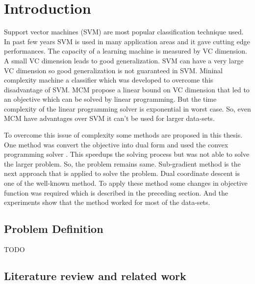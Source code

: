 \chapter{Introduction}

Support vector machines (SVM) are most popular classification technique used. In past few years SVM is used in many application areas and it gave cutting edge performances. The capacity of a learning machine is measured by VC dimension. A small VC dimension leads to good generalization. SVM can have a very large VC dimension so good generalization is not guaranteed in SVM. Mininal complexity machine a classifier which was developed to overcome this disadvantage of SVM. MCM propose a linear bound on VC dimension that led to an objective which can be solved by linear programming\cite{MCM}. But the time complexity of the linear programming solver is exponential in worst case. So, even MCM have advantages over SVM it can't be used for larger data-sets.


To overcome this issue of complexity some methods are proposed in this thesis. One method was convert the objective into dual form and used the convex programming solver . This speedups the solving process but was not able to solve the larger problem. So, the problem remains same.
Sub-gradient method is the next approach that is applied to solve the problem. Dual coordinate descent is one of the well-known method. To apply these method some changes in objective function was required which is described in the preceding section. And the experiments show that the method worked for most of the data-sets.

\section{Problem Definition}

TODO


\section{Literature review and related work}


